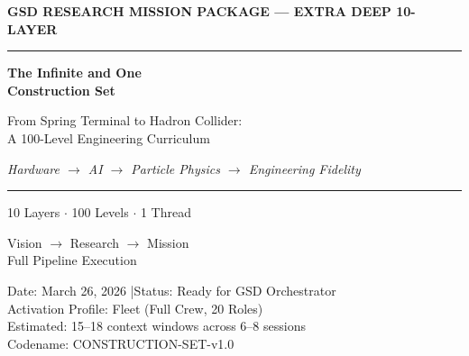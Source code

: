 \documentclass[11pt,letterpaper]{article}
\begin{document}
\thispagestyle{empty}
\begin{center}
\vspace*{2.5cm}

{\small\sffamily\textcolor{primary}{\textbf{GSD RESEARCH MISSION PACKAGE --- EXTRA DEEP 10-LAYER}}}

\vspace{0.3cm}
\textcolor{bordergray}{\rule{9cm}{0.4pt}}

\vspace{1.5cm}
{\fontsize{30}{36}\selectfont\bfseries\sffamily\textcolor{primary}{The Infinite and One\\[0.3em]Construction Set}}

\vspace{0.8cm}
{\Large\sffamily\textcolor{secondary}{From Spring Terminal to Hadron Collider:\\A 100-Level Engineering Curriculum}}

\vspace{0.5cm}
{\large\sffamily\itshape\textcolor{tertiary}{Hardware $\rightarrow$ AI $\rightarrow$ Particle Physics $\rightarrow$ Engineering Fidelity}}

\vspace{2.5cm}
\textcolor{bordergray}{\rule{9cm}{0.4pt}}

\vspace{0.8cm}
{\large\sffamily\textcolor{accent}{10 Layers $\cdot$ 100 Levels $\cdot$ 1 Thread}}

\vspace{0.5cm}
{\sffamily\textcolor{accent}{Vision $\rightarrow$ Research $\rightarrow$ Mission}}\\[0.3em]
{\small\sffamily\textcolor{accent}{Full Pipeline Execution}}

\vspace{2.5cm}
\begin{minipage}{0.75\textwidth}
\centering
{\small\sffamily\textcolor{subtlegray}{Date: March 26, 2026 \quad|\quad Status: Ready for GSD Orchestrator}}\\[0.3em]
{\small\sffamily\textcolor{subtlegray}{Activation Profile: Fleet (Full Crew, 20 Roles)}}\\[0.3em]
{\small\sffamily\textcolor{subtlegray}{Estimated: 15--18 context windows across 6--8 sessions}}\\[0.3em]
{\small\sffamily\textcolor{subtlegray}{Codename: CONSTRUCTION-SET-v1.0}}
\end{minipage}
\end{center}
\newpage
\end{document}
